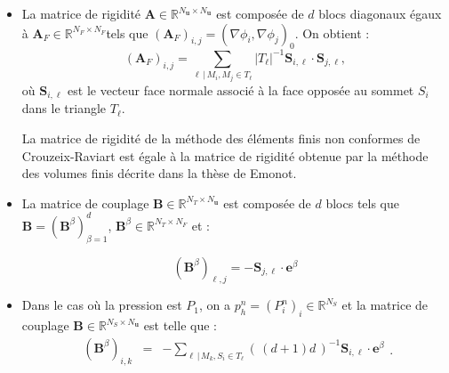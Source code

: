 \begin{itemize}
\item La matrice de rigidit\'e $\mathbf{A}\in\mathbb{R}^{N_{\mathbf{u}}\times N_{\mathbf{u}}}$
est compos\'ee de $d$ blocs diagonaux \'egaux \`a $\mathbf{A}_{F}\in\mathbb{R}^{N_{F}\times N_{F}}$tels
que $\left(\mathbf{A}_{F}\right)_{i,j}=(\nabla\phi_{i},\nabla\phi_{j})_{0}$.
On obtient : 
\[
\left(\mathbf{A}_{F}\right)_{i,j}=\sum_{\ell\,|\,M_{i},M_{j}\in T_{\ell}}|T_{\ell}|^{-1}\mathbf{S}_{i,\ell}\cdot\mathbf{S}_{j,\ell},
\]
o\`u $\mathbf{S}_{i,\ell}$ est le vecteur \og face normale \fg{}
associ\'e \`a la face oppos\'ee au sommet $S_{i}$ dans le triangle $T_{\ell}$.


La matrice de rigidit\'e de la m\'ethode des \'el\'ements finis non conformes
de Crouzeix-Raviart est \'egale \`a la matrice de rigidit\'e obtenue par
la m\'ethode des volumes finis d\'ecrite dans la th\`ese de Emonot.

\item La matrice de couplage $\mathbf{B}\in\mathbb{R}^{N_{T}\times N_{\mathbf{u}}}$
est compos\'ee de $d$ blocs tels que $\mathbf{B}=(\mathbf{B}^{\beta})_{\beta=1}^{d}$,
$\mathbf{B}^{\beta}\in\mathbb{R}^{N_{T}\times N_{F}}$ et :


\[
(\mathbf{B}^{\beta})_{\ell,j}=-\mathbf{S}_{j,\ell}\cdot\mathbf{e}^{\beta}
\]


\item Dans le cas o\`u la pression est $P_{1}$, on a $p_{h}^{n}=(P_{i}^{n})_{i}\in\mathbb{R}^{N_{S}}$
et la matrice de couplage $\mathbf{B}\in\mathbb{R}^{N_{S}\times N_{\mathbf{u}}}$
est telle que : 
\[
\begin{array}{rcl}
(\mathbf{B}^{\beta})_{i,k} & = & -\sum_{\ell\,|\,M_{k},S_{i}\in T_{\ell}}(\,(d+1)d\,)^{-1}\mathbf{S}_{i,\ell}\cdot\mathbf{e}^{\beta}\end{array}.
\]

\end{itemize}
